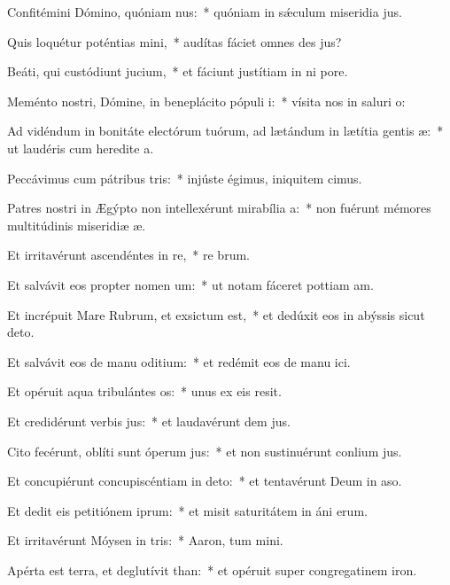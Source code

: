 \item Confitémini Dómino, quóniam nus:~* quóniam in sǽculum miseridia jus.
\item Quis loquétur poténtias mini,~* audítas fáciet omnes des jus?
\item Beáti, qui custódiunt jucium,~* et fáciunt justítiam in ni pore.
\item Meménto nostri, Dómine, in beneplácito pópuli i:~* vísita nos in saluri o:
\item Ad vidéndum in bonitáte electórum tuórum, ad lætándum in lætítia gentis æ:~* ut laudéris cum heredite a.
\item Peccávimus cum pátribus tris:~* injúste égimus, iniquitem cimus.
\item Patres nostri in Ægýpto non intellexérunt mirabília a:~* non fuérunt mémores multitúdinis miseridiæ æ.
\item Et irritavérunt ascendéntes in re,~* re brum.
\item Et salvávit eos propter nomen um:~* ut notam fáceret pottiam am.
\item Et incrépuit Mare Rubrum, et exsictum est,~* et dedúxit eos in abýssis sicut  deto.
\item Et salvávit eos de manu oditium:~* et redémit eos de manu ici.
\item Et opéruit aqua tribulántes os:~* unus ex eis  resit.
\item Et credidérunt verbis jus:~* et laudavérunt dem jus.
\item Cito fecérunt, oblíti sunt óperum jus:~* et non sustinuérunt conlium jus.
\item Et concupiérunt concupiscéntiam in deto:~* et tentavérunt Deum in aso.
\item Et dedit eis petitiónem iprum:~* et misit saturitátem in áni erum.
\item Et irritavérunt Móysen in tris:~* Aaron, tum mini.
\item Apérta est terra, et deglutívit than:~* et opéruit super congregatinem iron.

